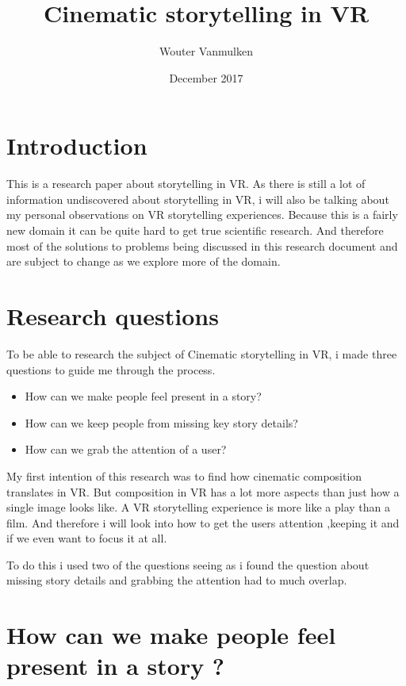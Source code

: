 \documentclass{report}
\title{Cinematic storytelling in VR}
\author{Wouter Vanmulken}
\date{December 2017}
\begin{document}
			
				\maketitle
				\tableofcontents
				\newpage
		
				\chapter{Introduction}
				
				This is a research paper about storytelling in VR. As there is still a lot of information undiscovered about storytelling in VR, i will also be talking about my personal observations on VR storytelling experiences. Because this is a fairly new domain it can be quite hard to get true scientific research. And therefore most of the solutions to problems being discussed in this research document and are subject to change as we explore more of the domain.
				
				\chapter{Research questions}
		
				To be able to research the subject of Cinematic storytelling in VR, i made three questions to guide me through the process.
				\begin{itemize}
					\item How can we make people feel present in a story?
					\item How can we keep people from missing key story details?
					\item How can we grab the attention of a user?
				\end{itemize}

				My first intention of this research was to find how cinematic composition translates in VR. But composition in VR has a lot more aspects than just how a single image looks like. A VR storytelling experience is more like a play than a film. And therefore i will look into how to get the users attention ,keeping it and if we even want to focus it at all.
				
				To do this i used two of the questions seeing as i found the question about missing story details and grabbing the attention had to much overlap.
				
				
				

				
				\chapter{How can we make people feel present in a story ?}
				
\end{document}
